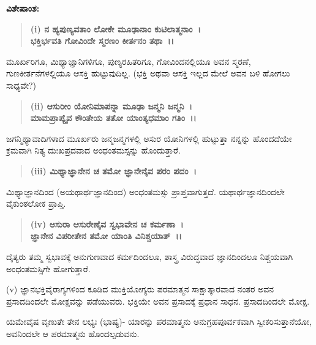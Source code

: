 \noindent
\textbf{ವಿಶೇಷಾಂಶ:\enginline{-}}

\begin{verse}
\textbf{(i) ನ ಹ್ಯಪುಣ್ಯವತಾಂ ಲೋಕೇ ಮೂಢಾನಾಂ ಕುಟಿಲಾತ್ಮನಾಂ~।}\\\textbf{ಭಕ್ತಿರ್ಭವತಿ ಗೋವಿಂದೇ ಸ್ಮರಣಂ ಕೀರ್ತನಂ ತಥಾ~।।}
\end{verse}


\vskip 3pt

ಮೂರ್ಖರಿಗೂ, ಮಿಥ್ಯಾಜ್ಞಾನಿಗಳಿಗೂ, ಪುಣ್ಯರಹಿತರಿಗೂ, ಗೋವಿಂದನಲ್ಲಿಯೂ ಅವನ ಸ್ಮರಣೆ, ಗುಣಕೀರ್ತನೆಗಳಲ್ಲಿಯೂ ಆಸಕ್ತಿ ಹುಟ್ಟುವುದಿಲ್ಲ. (ಭಕ್ತಿ ಅಥವಾ ಆಸಕ್ತಿ ಇಲ್ಲದ ಮೇಲೆ ಅವನ ಬಳಿ ಹೋಗಲು ಸಾಧ್ಯವೇ?)

\begin{verse}
\textbf{(ii) ಆಸುರೀಂ ಯೋನಿಮಾಪನ್ನಾ ಮೂಢಾ ಜನ್ಮನಿ ಜನ್ಮನಿ~।}\\\textbf{ಮಾಮಪ್ರಾಪ್ಯೈವ ಕೌಂತೇಯ ತತೋ ಯಾಂತ್ಯಧಮಾಂ ಗತಿಂ~।।}
\end{verse}


\vskip 3pt

ಜಗನ್ಮಿಥ್ಯಾವಾದಿಗಳಾದ ಮೂರ್ಖರು ಜನ್ಮಜನ್ಮಗಳಲ್ಲಿ ಅಸುರ ಯೋನಿಗಳಲ್ಲಿ ಹುಟ್ಟುತ್ತಾ ನನ್ನನ್ನು ಹೊಂದದೆಯೇ ಕ್ರಮವಾಗಿ ನಿತ್ಯ ದುಃಖಪ್ರದವಾದ ಅಂಧಂತಮಸ್ಸನ್ನು ಹೊಂದುತ್ತಾರೆ.

\begin{verse}
\textbf{(iii) ಮಿಥ್ಯಾಜ್ಞಾನೇನ ಚ ತಮೋ ಜ್ಞಾನೇನೈವ ಪರಂ ಪದಂ~।}
\end{verse}


\vskip 3pt

ಮಿಥ್ಯಾಜ್ಞಾನದಿಂದ (ಅಯಥಾರ್ಥಜ್ಞಾನದಿಂದ) ಅಂಧಂತಮಸ್ಸು ಪ್ರಾಪ್ತವಾಗುತ್ತದೆ. ಯಥಾರ್ಥಜ್ಞಾನದಿಂದಲೇ ವೈಕುಂಠಲೋಕ ಪ್ರಾಪ್ತಿ.

\begin{verse}
\textbf{(iv) ಅಸುರಾ ಆಸುರೇಣೈವ ಸ್ವಭಾವೇನ ಚ ಕರ್ಮಣಾ~।\\ ಜ್ಞಾನೇನ ವಿಪರೀತೇನ ತಮೋ ಯಾಂತಿ ವಿನಿಶ್ಚಯಾತ್~।।}
\end{verse}

\vskip -3pt


\vskip 3pt

ದೈತ್ಯರು ತಮ್ಮ ಸ್ವಭಾವಕ್ಕೆ ಅನುಗುಣವಾದ ಕರ್ಮದಿಂದಲೂ, ಶಾಸ್ತ್ರ ವಿರುದ್ಧವಾದ ಜ್ಞಾನದಿಂದಲೂ ನಿಶ್ಚಯವಾಗಿ ಅಂಧಂತಮಸ್ಸಿಗೇ ಹೋಗುತ್ತಾರೆ.

(v) ಜ್ಞಾನಭಕ್ತಿವೈರಾಗ್ಯಗಳಿಂದ ಕೂಡಿದ ಮುಕ್ತಿಯೋಗ್ಯರು ಪರಮಾತ್ಮನ ಸಾಕ್ಷಾತ್ಕಾರವಾದ ನಂತರ ಅವನ ಪ್ರಸಾದದಿಂದಲೇ ಮೋಕ್ಷವನ್ನು ಪಡೆಯುವರು. ಭಕ್ತಿಯೇ ಅವನ ಪ್ರಸಾದಕ್ಕೆ ಪ್ರಧಾನ ಸಾಧನ. ಪ್ರಸಾದದಿಂದಲೇ ಮೋಕ್ಷ.

ಯಮೇವೈಷ ವೃಣುತೇ ತೇನ ಲಭ್ಯಃ (ಭಾಷ್ಯ)- ಯಾರನ್ನು ಪರಮಾತ್ಮನು ಅನುಗ್ರಹಪೂರ್ವಕವಾಗಿ ಸ್ವೀಕರಿಸುತ್ತಾನೆಯೋ, ಅವನಿಂದಲೇ ಆ ಪರಮಾತ್ಮನು ಹೊಂದಲ್ಪಡುವನು.

